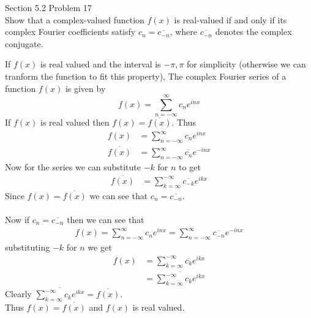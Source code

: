\documentclass[answers,12pt,addpoints]{exam}
\begin{document}
\begin{questions}
    \question Section 5.2 Problem 17\\
    Show that a complex-valued function \( f(x) \) is real-valued if and only if its complex Fourier coefficients satisfy \( c_n = \overline{c_{-n}} \), where \( \overline{c_{-n}} \) denotes the complex conjugate.
    \begin{solution}
        If $f(x)$ is real valued and the interval is $-\pi, \pi$ for simplicity (otherwise we can tranform the function to fit this property), The complex Fourier series of a function $f(x)$ is given by 
        $$f(x) = \sum_{n=-\infty}^{\infty} c_n e^{inx}$$
        If $f(x)$ is real valued then $f(x) = \overline{f(x)}$. Thus
        \begin{align*}
            f(x) &= \sum_{n=-\infty}^{\infty} c_n e^{inx}\\
            \overline{f(x)} &= \sum_{n=-\infty}^{\infty} \overline{c_n} e^{-inx}
        \end{align*}
        Now for the series we can substitute $-k$ for $n$ to get
        \begin{align*}
            \overline{f(x)} &= \sum_{k=\infty}^{-\infty} \overline{c_{-k}} e^{ikx}
        \end{align*}
        Since $f(x) = \overline{f(x)}$ we can see that $c_n = \overline{c_{-n}}$.\\\\
        Now if $c_n = \overline{c_{-n}}$ then we can see that 
        \begin{align*}
            f(x) = \sum_{n=-\infty}^{\infty} c_n e^{inx} = \sum_{n=-\infty}^{\infty} \overline{c_{-n}} e^{-inx}
        \end{align*}
        substituting $-k$ for $n$ we get
        \begin{align*}
            f(x) &= \sum_{k=\infty}^{-\infty} \overline{c_{k}} e^{ikx}\\
            &= \overline{\sum_{k=\infty}^{-\infty} c_k e^{ikx}}
        \end{align*}
        Clearly $\overline{\sum_{k=\infty}^{-\infty} c_k e^{ikx}} = \overline{f(x)}$. \\
        Thus $f(x) = \overline{f(x)}$ and $f(x)$ is real valued.
    \end{solution}


\end{questions}
\end{document}
